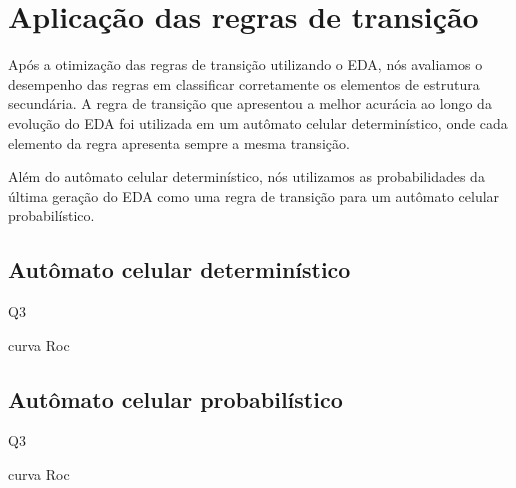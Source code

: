 \chapter{Aplicação das regras de transição}

Após a otimização das regras de transição utilizando o EDA, nós avaliamos o desempenho das regras em classificar corretamente os elementos de estrutura secundária. A regra de transição que apresentou a melhor acurácia ao longo da evolução do EDA foi utilizada em um autômato celular determinístico, onde cada elemento da regra apresenta sempre a mesma transição.

Além do autômato celular determinístico, nós utilizamos as probabilidades da última geração do EDA como uma regra de transição para um autômato celular probabilístico.  

\section{Autômato celular determinístico}

Q3

curva Roc

\section{Autômato celular probabilístico}

Q3

curva Roc
